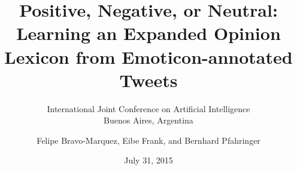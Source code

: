\documentclass[handout]{beamer}
\title{Positive, Negative, or Neutral: Learning an Expanded Opinion Lexicon from Emoticon-annotated Tweets}
\subtitle[IJCAI'15]{International Joint Conference on Artificial Intelligence\\ Buenos Aires, Argentina}
\author[Felipe Bravo Márquez]{\footnotesize
Felipe Bravo-Marquez, Eibe Frank, and Bernhard Pfahringer}
\institute{University of Waikato \\ Computer Science Department }
\date{July 31, 2015}
\begin{document}
\begin{frame}
\titlepage


\end{frame}




\end{document}
